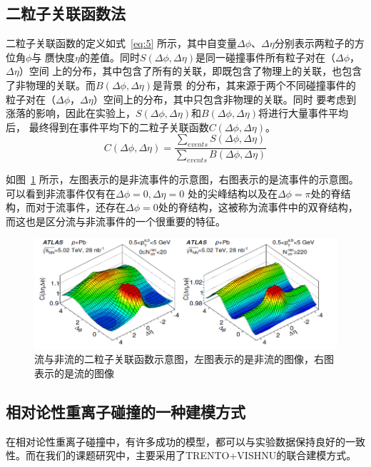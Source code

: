 \documentclass[aps,pre,12pt,preprint,onecolumn,showpacs,showkeys]{revtex4-1}
\begin{document}
\subsection{二粒子关联函数法}
二粒子关联函数的定义如式~\ref{eq:5} 所示\cite{PhysRevC.96.024908,PhysRevLett.116.172302}，其中自变量$\Delta\phi$、$\Delta\eta$分别表示两粒子的方位角$\phi$与
赝快度$\eta$的差值。同时$S(\Delta\phi,\Delta\eta)$是同一碰撞事件所有粒子对在（$\Delta\phi$，$\Delta\eta$）空间
上的分布，其中包含了所有的关联，即既包含了物理上的关联，也包含了非物理的关联。而$B(\Delta\phi,\Delta\eta)$是背景
的分布，其来源于两个不同碰撞事件的粒子对在（$\Delta\phi$，$\Delta\eta$）空间上的分布，其中只包含非物理的关联。同时
要考虑到涨落的影响，因此在实验上，$S(\Delta\phi,\Delta\eta)$和$B(\Delta\phi,\Delta\eta)$将进行大量事件平均后，
最终得到在事件平均下的二粒子关联函数$C(\Delta\phi,\Delta\eta)$。
\begin{equation}
C(\Delta\phi,\Delta\eta)=\frac{\sum_{events}S(\Delta\phi,\Delta\eta)}{\sum_{events}B(\Delta\phi,\Delta\eta)} \label{eq:5}
\end{equation}
\par
如图~\ref{fig:fnf} 所示\cite{PhysRevC.96.024908}，左图表示的是非流事件的示意图，右图表示的是流事件的示意图。可以看到非流事件仅有在$\Delta\phi=0,\Delta\eta=0$
处的尖峰结构以及在$\Delta\phi=\pi$处的脊结构，而对于流事件，还存在$\Delta\phi=0$处的脊结构，这被称为流事件中的双脊结构，
而这也是区分流与非流事件的一个很重要的特征。
\begin{figure}[htbp]
\centering
\includegraphics[width=140mm]{fnf}
\caption{\label{fig:fnf}%
流与非流的二粒子关联函数示意图，左图表示的是非流的图像，右图表示的是流的图像}
\end{figure}
\subsection{相对论性重离子碰撞的一种建模方式}
在相对论性重离子碰撞中，有许多成功的模型，都可以与实验数据保持良好的一致性。而在我们的课题研究中，主要采用了TRENTO+VISHNU的联合建模方式。
\end{document}
